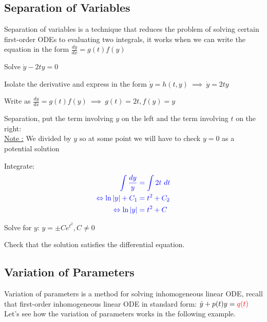 \documentclass[11pt, openright]{book}
\begin{document}
\subsection{Separation of Variables}

Separation of variables is a technique that reduces the problem of solving certain first-order ODEs to evaluating two integrals, it works when we can write the equation in the form $\frac{dy}{dx}=g(t)f(y)$

\begin{dent}{}
    Solve $\dot{y}-2ty=0$

    \begin{items}{-15pt}{-15pt}
        \item Isolate the derivative and express in the form $\dot{y}=h(t,y)\ \implies\ \dot{y}=2ty$
        \item Write as $\frac{dy}{dx}=g(t)f(y)\ \implies\ g(t)=2t, f(y)=y$
        \item Separation, put the term involving $y$ on the left and the term involving $t$ on the right:\\
        \uline{Note :}\hspace{2mm} We divided by $y$ so at some point we will have to check $y=0$ as a potential solution
        \item Integrate:\vspace{-15pt}
        \begin{align*}
            \color{blue}\int \frac{dy}{y} & \color{blue}=\int 2t\ dt \\
            \color{blue}\Leftrightarrow \ln |y|+C_1  & \color{blue}=t^2+C_2     \\
            \color{blue}\Leftrightarrow \ln |y|      & \color{blue}=t^2+C
        \end{align*}
        \item Solve for $y$: $y=\pm Ce^{t^2}, C\neq0$
        \item Check that the solution satisfies the differential equation.
    \end{items}
\end{dent}

\subsection{Variation of Parameters}

Variation of parameters is a method for solving inhomogeneous linear ODE, recall that first-order inhomogeneous linear ODE in standard form: $\dot{y}+p(t)y=\textcolor{red}{q(t)}$\\
Let's see how the variation of parameters works in the following example.
\end{document}
